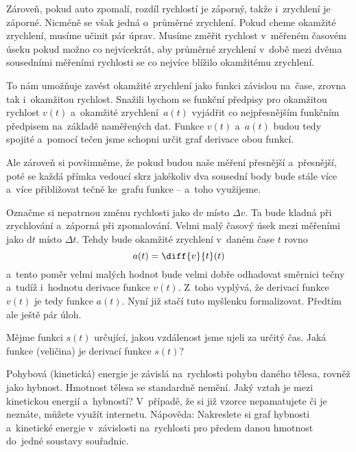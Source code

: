 Zároveň, pokud auto zpomalí, rozdíl rychlostí je záporný, takže i~zrychlení je
záporné. Nicméně se však jedná o~průměrné zrychlení. Pokud cheme okamžité zrychlení,
musíme učinit pár úprav. Musíme změřit rychlost v~měřeném časovém úseku pokud možno
co nejvícekrát, aby průměrné zrychlení v~době mezi dvěma sousedními měřeními
rychlosti se co nejvíce blížilo okamžitému zrychlení.

To nám umožňuje zavést okamžité zrychlení jako funkci závislou na~čase, zrovna tak
i~okamžitou rychlost. Snažili bychom se funkční předpisy pro okamžitou rychlost
$v(t)$ a~okamžité zrychlení~$a(t)$ vyjádřit co nejpřesnějším funkčním předpisem
na~základě naměřených dat. Funkce $v(t)$ a~$a(t)$ budou tedy spojité a~pomocí tečen
jsme schopni určit graf derivace obou funkcí.

Ale zároveň si povšimněme, že pokud budou naše měření přesnější a~přesnější, poté se
každá přímka vedoucí skrz jakékoliv dva sousední body bude stále více a~více
přibližovat tečně ke~grafu funkce -- a~toho využijeme.

Označme si nepatrnou změnu
rychlosti jako $\text{d} v$ místo $\Delta v$. Ta bude kladná při zrychlování
a~záporná při zpomalování. Velmi malý časový úsek mezi měřeními jako $\text{d} t$
místo $\Delta t$. Tehdy bude okamžité zrychlení v~daném čase $t$ rovno
\begin{equation*}
    a(t) = \diff{v}{t}(t)
\end{equation*}
a~tento poměr velmi malých hodnot bude velmi dobře odhadovat směrnici tečny a~tudíž
i~hodnotu derivace funkce $v(t)$. Z~toho vyplývá, že derivací funkce $v(t)$ je tedy
funkce $a(t)$. Nyní již stačí tuto myšlenku formalizovat. Předtím ale ještě pár úloh.

\begin{exercise}
    Mějme funkci $s(t)$ určující, jakou vzdálenost jsme ujeli za určitý čas. Jaká
    funkce (veličina) je derivací funkce $s(t)$?
\end{exercise}

\begin{exercise}
    Pohybová (kinetická) energie je závislá na~rychlosti pohybu daného tělesa, rovněž
    jako hybnost. Hmotnost tělesa se standardně nemění. Jaký vztah je mezi kinetickou
    energií a~hybností? V~případě, že si již vzorce nepamatujete či je neznáte,
    můžete využít internetu. Nápověda: Nakreslete si graf hybnosti a~kinetické
    energie v~závislosti na~rychlosti pro předem danou hmotnost do~jedné soustavy
    souřadnic.
\end{exercise}

